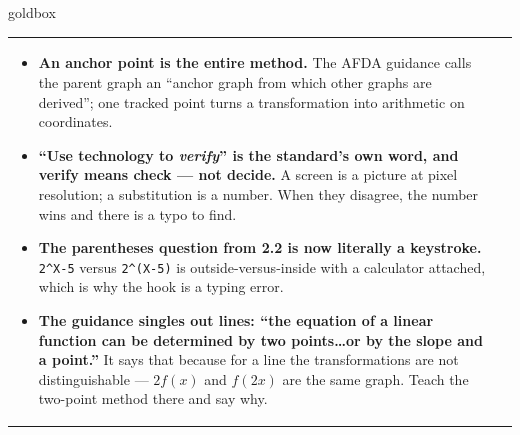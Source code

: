 \documentclass[10pt]{article}
\begin{document}
\begin{skillbox}{goldbox}
\begin{tabularx}{\linewidth}{@{}X|X@{}}
\begin{minipage}[t]{\linewidth}
\begin{itemize}[leftmargin=1.1em, itemsep=2pt, topsep=2pt]
        directions.
  \item \textbf{An anchor point is the entire method.} The AFDA guidance calls the parent graph an
        ``anchor graph from which other graphs are derived''; one tracked point turns a
        transformation into arithmetic on coordinates.
  \item \textbf{``Use technology to \emph{verify}'' is the standard's own word, and verify means
        check --- not decide.} A screen is a picture at pixel resolution; a substitution is a number.
        When they disagree, the number wins and there is a typo to find.
  \item \textbf{The parentheses question from 2.2 is now literally a keystroke.}
        \texttt{2\^{}X-5} versus \texttt{2\^{}(X-5)} is outside-versus-inside with a calculator
        attached, which is why the hook is a typing error.
  \item \textbf{The guidance singles out lines: ``the equation of a linear function can be determined
        by two points\dots or by the slope and a point.''} It says that because for a line the
        transformations are not distinguishable --- $2f(x)$ and $f(2x)$ are the same graph. Teach the
        two-point method there and say why.
\end{itemize}
\end{minipage}
\end{tabularx}
\end{skillbox}
\end{document}
